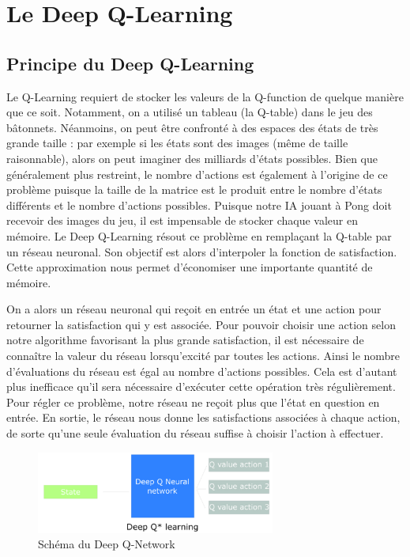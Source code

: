 \section{Le Deep Q-Learning}

\subsection{Principe du Deep Q-Learning}

Le Q-Learning requiert de stocker les valeurs de la Q-function de quelque manière que ce soit. Notamment, on a utilisé un tableau (la Q-table) dans le jeu des
bâtonnets. Néanmoins, on peut être confronté à des espaces des états de très grande taille : par exemple si les états sont des images (même de taille raisonnable), 
alors on peut imaginer des milliards d'états possibles. Bien que généralement plus restreint, le nombre d'actions est également à l'origine de ce problème puisque la
taille de la matrice est le produit entre le nombre d'états différents et le nombre d'actions possibles. Puisque notre IA jouant à Pong doit recevoir des images du jeu,
il est impensable de stocker chaque valeur en mémoire. Le Deep Q-Learning résout ce problème en remplaçant la Q-table par un réseau neuronal. Son objectif est alors 
d'interpoler la fonction de satisfaction. Cette approximation nous permet d'économiser une importante quantité de mémoire.

On a alors un réseau neuronal qui reçoit en entrée un état et une action pour retourner la satisfaction qui y est associée. Pour pouvoir choisir une action selon
notre algorithme favorisant la plus grande satisfaction, il est nécessaire de connaître la valeur du réseau lorsqu'excité par toutes les actions. Ainsi
le nombre d'évaluations du réseau est égal au nombre d'actions possibles. Cela est d'autant plus inefficace qu'il sera nécessaire d'exécuter cette opération très
régulièrement. Pour régler ce problème, notre réseau ne reçoit plus que l'état en question en entrée. En sortie, le réseau nous donne les satisfactions associées à chaque 
action, de sorte qu'une seule évaluation du réseau suffise à choisir l'action à effectuer.

\begin{figure}[h]
 \centering
 \includegraphics[width=0.7\textwidth]{img/schema_DQL.png}
 \caption{Schéma du Deep Q-Network}
\end{figure}


